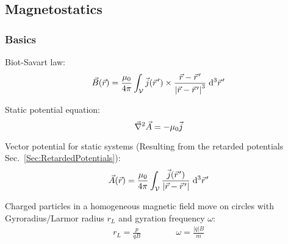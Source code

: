 	\subsection{Magnetostatics}
		\subsubsection{Basics}
			\noindent
			Biot-Savart law:
			\begin{equation}
				\vec{B}(\vec{r}) = \frac{\mu_0}{4\pi}\int_{\mathcal{V}} \vec{j}(\pvec{r}')\times\frac{\vec{r}-\pvec{r}'}{\left|\vec{r}-\pvec{r}'\right|^3}\;\dd^3\pvec{r}'
			\end{equation}

			\noindent
			Static potential equation:
			\begin{equation}
				\vec{\nabla}^2 \vec{A} = - \mu_0 \vec{j}
			\end{equation}

			\noindent
			Vector potential for static systems (Resulting from the retarded potentials Sec.~\ref{Sec:RetardedPotentials}):
			\begin{equation}
				\vec{A}(\vec{r}) = \frac{\mu_0}{4\pi} \int_{\mathcal{V}} \frac{\vec{j}(\pvec{r}')}{\left|\vec{r}-\pvec{r}'\right|} \;\dd^3\pvec{r}'
			\end{equation}

			\noindent
			Charged particles in a homogeneous magnetic field move on circles with Gyroradius/Larmor radius $r_L$ and gyration frequency $\omega$:
			\begin{equation}
				\begin{aligned}
					r_L = \frac{p}{qB} &&\hspace{30pt} %
					\omega = \frac{|q| B}{m}
				\end{aligned}
			\end{equation}

